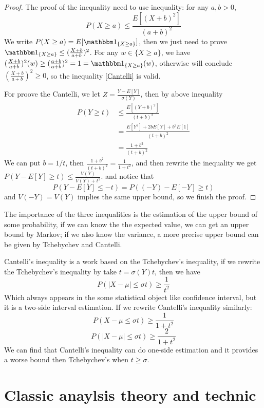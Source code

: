 \documentclass[en,geye,blue,pc,12pt]{elegantnote}
\begin{document}
\begin{proof} 
    The proof of the inequality need to use inequality: for any \(a,b>0\), 
    \begin{equation}
        P(X \geq a) \leq \frac{E[(X+b)^2]}{(a+b)^2}\label{Cantelli}
    \end{equation}
    We write \(P(X \geq a) = E[ \cha_{\{X \geq a\}}]\), then we just need to prove \(\cha_{\{X \geq a\}} \leq (\frac{X+b}{a+b})^2\).
    For any \(w \in \{X \geq a\}\), we have \((\frac{X+b}{a+b})^2(w) \geq (\frac{a+b}{a+b})^2 = 1 =\cha_{\{X \geq a\}}(w)\), otherwise will conclude \((\frac{X+b}{a+b})^2 \geq 0\), so the inequality \ref{Cantelli} is valid.

    For proove the Cantelli, we let \(Z = \frac{Y-E[Y]}{\sigma(Y)}\), then by above inequality
    \begin{align*}
        P(Y \geq t) &\leq \frac{E[(Y+b)^2]}{(t+b)^2} \\
        &= \frac{E[Y^2]+2bE[Y]+b^2E[1]}{(t+b)^2} \\
        &= \frac{1+b^2}{(t+b)^2}
    \end{align*}
    We can put \(b = 1/t\), then \(\frac{1+b^2}{(t+b)^2} = \frac{1}{1+t^2}\), and then rewrite the inequality we get 
    \(P(Y-E[Y] \geq t) \leq \frac{V(Y)}{V(Y)+t^2}\).
    and notice that 
    \[P(Y-E[Y] \leq -t) = P((-Y)-E[-Y] \geq t)\]
    and \(V(-Y)=V(Y)\) implies the same upper bound, so we finish the proof.
\end{proof}

The importance of the three inequalities is the estimation of the upper bound of some probability, if we can know the the expected value, we can get an upper bound by Markov; if we also know the variance, a more precise upper bound can be given by Tchebychev and Cantelli.

Cantelli's inequality is a work based on the Tchebychev's inequality, if we rewrite the Tchebychev's inequality by take \(t = \sigma(Y)t\), then we have
    \[P(|X-\mu|\leq \sigma t) \geq \frac{1}{t^2} \label{eq:Tchebychev}\]
Which always appears in the some statistical object like confidence interval, but it is a two-side interval estimation. If we rewrite Cantelli's inequality similarly:
\[P(X-\mu\leq \sigma t) \geq \frac{1}{1+t^2}\]
\[P(|X-\mu|\leq \sigma t) \geq \frac{2}{1+t^2}\]
We can find that Cantelli's inequality can do one-side estimation and it provides a worse bound then Tchebychev's when \(t \geq \sigma\).

\section{Classic anaylsis theory and technic}
\end{document}
